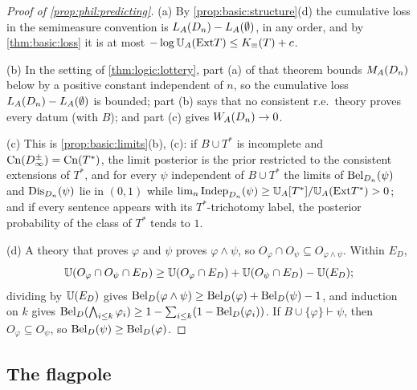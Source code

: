 \begin{proof}[Proof of \cref{prop:phil:predicting}]
(a) By \cref{prop:basic:structure}(d) the cumulative loss in the semimeasure convention is $L_{A}(D_n)-L_{A}(\emptyset)$, in any order, and by \cref{thm:basic:loss} it is at most $-\log\mathbb{U}_{A}(\mathrm{Ext} T)\le K_{\equiv}(T)+c$.

(b) In the setting of \cref{thm:logic:lottery}, part (a) of that theorem bounds $M_{A}(D_n)$ below by a positive constant independent of $n$, so the cumulative loss $L_{A}(D_n)-L_{A}(\emptyset)$ is bounded; part (b) says that no consistent r.e.\ theory proves every datum (with $B$); and part (c) gives $W_{A}(D_n)\to0$.

(c) This is \cref{prop:basic:limits}(b), (c): if $B\cup T^*$ is incomplete and $\mathrm{Cn}(D_\infty^\pm)=\mathrm{Cn}(T^*)$, the limit posterior is the prior restricted to the consistent extensions of $T^*$, and for every $\psi$ independent of $B\cup T^*$ the limits of $\mathrm{Bel}_{D_n}(\psi)$ and $\mathrm{Dis}_{D_n}(\psi)$ lie in $(0,1)$ while $\lim_n\mathrm{Indep}_{D_n}(\psi)\ge\mathbb{U}_{A}[T^*]/\mathbb{U}_{A}(\mathrm{Ext} T^*)>0$; and if every sentence appears with its $T^*$-trichotomy label, the posterior probability of the class of $T^*$ tends to $1$.

(d) A theory that proves $\varphi$ and $\psi$ proves $\varphi\wedge\psi$, so $O_\varphi\cap O_\psi\subseteq O_{\varphi\wedge\psi}$. Within $E_D$,
\[
\mathbb{U}(O_\varphi\cap O_\psi\cap E_D)\ge\mathbb{U}(O_\varphi\cap E_D)+\mathbb{U}(O_\psi\cap E_D)-\mathbb{U}(E_D);
\]
dividing by $\mathbb{U}(E_D)$ gives $\mathrm{Bel}_D(\varphi\wedge\psi)\ge\mathrm{Bel}_D(\varphi)+\mathrm{Bel}_D(\psi)-1$, and induction on $k$ gives $\mathrm{Bel}_D(\bigwedge_{i\le k}\varphi_i)\ge1-\sum_{i\le k}(1-\mathrm{Bel}_D(\varphi_i))$. If $B\cup\{\varphi\}\vdash\psi$, then $O_\varphi\subseteq O_\psi$, so $\mathrm{Bel}_D(\psi)\ge\mathrm{Bel}_D(\varphi)$.
\end{proof}

\subsection{The flagpole}\label{app:phil:flagpole}

